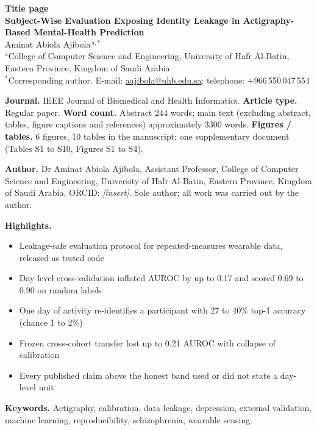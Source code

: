 \documentclass[11pt,a4paper]{article}
\begin{document}
\begin{center}
{\large\bfseries Title page}\\[1.2em]
{\LARGE\bfseries Subject-Wise Evaluation Exposing Identity Leakage in Actigraphy-Based Mental-Health Prediction}\\[1.6em]
{\large Aminat Abiola Ajibola$^{\,\mathrm{a},*}$}\\[0.8em]
{\small $^{\mathrm{a}}$College of Computer Science and Engineering, University of Hafr Al-Batin, Eastern Province, Kingdom of Saudi Arabia}\\[0.3em]
{\small $^{*}$Corresponding author. E-mail: \href{mailto:aajibola@uhb.edu.sa}{aajibola@uhb.edu.sa}; telephone: +966\,550\,047\,554}
\end{center}
\vspace{0.8em}

\textbf{Journal.} IEEE Journal of Biomedical and Health Informatics. \quad \textbf{Article type.} Regular paper. \quad \textbf{Word count.} Abstract 244 words; main text (excluding abstract, tables, figure captions and references) approximately 3300 words. \quad \textbf{Figures / tables.} 6 figures, 10 tables in the manuscript; one supplementary document (Tables S1 to S10, Figures S1 to S4).

\textbf{Author.} Dr Aminat Abiola Ajibola, Assistant Professor, College of Computer Science and Engineering, University of Hafr Al-Batin, Eastern Province, Kingdom of Saudi Arabia. ORCID: \textit{[insert]}. Sole author; all work was carried out by the author.

\textbf{Highlights.}
\begin{itemize}[nosep,leftmargin=1.4em]
\item Leakage-safe evaluation protocol for repeated-measures wearable data, released as tested code
\item Day-level cross-validation inflated AUROC by up to 0.17 and scored 0.69 to 0.90 on random labels
\item One day of activity re-identifies a participant with 27 to 40\% top-1 accuracy (chance 1 to 2\%)
\item Frozen cross-cohort transfer lost up to 0.21 AUROC with collapse of calibration
\item Every published claim above the honest band used or did not state a day-level unit
\end{itemize}

\textbf{Keywords.} Actigraphy, calibration, data leakage, depression, external validation, machine learning, reproducibility, schizophrenia, wearable sensing.
\end{document}

